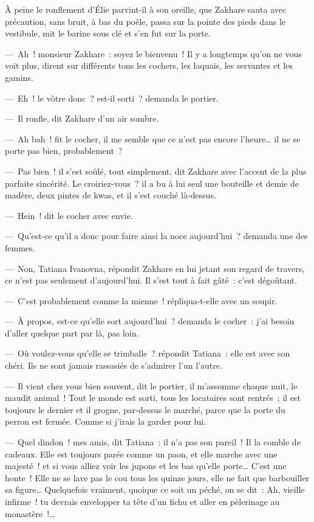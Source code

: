 \documentclass[french,twoside]{book} %
\begin{document}
\noindent À peine le ronflement d’Élie parvint-il à son oreille, que Zakhare sauta avec précaution, sans bruit, à bas du poêle, passa sur la pointe des pieds dans le vestibule, mit le barine sous clé et s’en fut sur la porte.\par
— Ah ! monsieur Zakhare : soyez le bienvenu ! Il y a longtemps qu’on ne vous voit plus, dirent sur différents tons les cochers, les laquais, les servantes et les gamins.\par
— Eh ! le vôtre donc ? est-il sorti ? demanda le portier.\par
— Il ronfle, dit Zakhare d’un air sombre.\par
— Ah bah ! fit le cocher, il me semble que ce n’est pas encore l’heure… il ne se porte pas bien, probablement ?\par
— Pas bien ! il s’est soûlé, tout simplement, dit Zakhare avec l’accent de la plus parfaite sincérité. Le croiriez-vous ? il a bu à lui seul une bouteille et demie de madère, deux pintes de kwas, et il s’est couché là-dessus.\par
— Hein ! dit le cocher avec envie.\par
— Qu’est-ce qu’il a donc pour faire ainsi la noce aujourd’hui ? demanda une des femmes.\par
— Non, Tatiana Ivanovna, répondit Zakhare en lui jetant son regard de travers, ce n’est pas seulement d’aujourd’hui. Il s’est tout à fait gâté : c’est dégoûtant.\par
— C’est probablement comme la mienne ! répliqua-t-elle avec un soupir.\par
— À propos, est-ce qu’elle sort aujourd’hui ? demanda le cocher : j’ai besoin d’aller quelque part par là, pas loin.\par
— Où voulez-vous qu’elle se trimballe ? répondit Tatiana : elle est avec son chéri. Ils ne sont jamais rassasiés de s’admirer l’un l’autre.\par
— Il vient chez vous bien souvent, dit le portier, il m’assomme chaque nuit, le maudit animal ! Tout le monde est sorti, tous les locataires sont rentrés ; il est toujours le dernier et il grogne, par-dessus le marché, parce que la porte du perron est fermée. Comme si j’irais la garder pour lui.\par
— Quel dindon ! mes amis, dit Tatiana : il n’a pas son pareil ! Il la comble de cadeaux. Elle est toujours parée comme un paon, et elle marche avec une majesté ! et si vous alliez voir les jupons et les bas qu’elle porte… C’est une honte ! Elle ne se lave pas le cou tous les quinze jours, elle ne fait que barbouiller sa figure… Quelquefois vraiment, quoique ce soit un péché, on se dit : Ah, vieille infirme ! tu devrais envelopper ta tête d’un fichu et aller en pèlerinage au monastère !…\par
\end{document}
